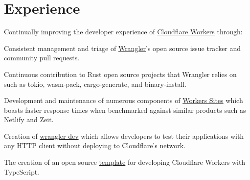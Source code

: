 \documentclass[]{deedy-resume-openfont}
\begin{document}
%
%

%
%


\section{Experience}

\vspace{\topsep}
Continually improving the developer experience of \href{https://workers.cloudflare.com}{Cloudflare Workers} through:
\begin{tightemize}
\item Consistent management and triage of \href{https://github.com/cloudflare/wrangler}{Wrangler}'s open source issue tracker and community pull requests.
\item Continuous contribution to Rust open source projects that Wrangler relies on such as tokio, wasm-pack, cargo-generate, and binary-install.
\item Development and maintenance of numerous components of \href{https://workers.cloudflare.com/sites}{Workers Sites} which boasts faster response times when benchmarked against similar products such as Netlify and Zeit.
\item Creation of \href{https://github.com/cloudflare/wrangler/milestone/18}{wrangler dev} which allows developers to test their applications with any HTTP client without deploying to Cloudflare's network.
\item The creation of an open source \href{https://github.com/EverlastingBugstopper/worker-typescript-template}{template} for developing Cloudflare Workers with TypeScript.
\end{tightemize}
\sectionsep
\end{document}
